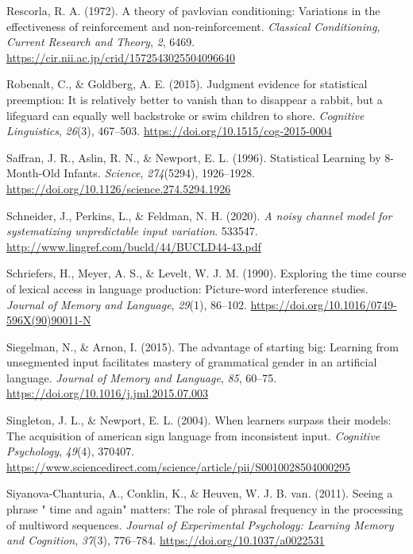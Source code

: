 \documentclass[
  12pt,
  letterpaper,
]{scrreport}
\newlength{\cslhangindent}
\newenvironment{CSLReferences}[2] %
 {\begin{list}{}{%
  \setlength{\itemindent}{0pt}
  \setlength{\leftmargin}{0pt}
  \setlength{\parsep}{0pt}
  \ifodd #1
   \setlength{\leftmargin}{\cslhangindent}
   \setlength{\itemindent}{-1\cslhangindent}
  \fi
  \setlength{\itemsep}{#2\baselineskip}}}
 {\end{list}}
\begin{document}
\begin{CSLReferences}{1}{0}
Rescorla, R. A. (1972). A theory of pavlovian conditioning: Variations
in the effectiveness of reinforcement and non-reinforcement.
\emph{Classical Conditioning, Current Research and Theory}, \emph{2},
6469. \url{https://cir.nii.ac.jp/crid/1572543025504096640}

Robenalt, C., \& Goldberg, A. E. (2015). Judgment evidence for
statistical preemption: It is relatively better to vanish than to
disappear a rabbit, but a lifeguard can equally well backstroke or swim
children to shore. \emph{Cognitive Linguistics}, \emph{26}(3), 467--503.
\url{https://doi.org/10.1515/cog-2015-0004}

Saffran, J. R., Aslin, R. N., \& Newport, E. L. (1996). Statistical
Learning by 8-Month-Old Infants. \emph{Science}, \emph{274}(5294),
1926--1928. \url{https://doi.org/10.1126/science.274.5294.1926}

Schneider, J., Perkins, L., \& Feldman, N. H. (2020). \emph{A noisy
channel model for systematizing unpredictable input variation}. 533547.
\url{http://www.lingref.com/bucld/44/BUCLD44-43.pdf}

Schriefers, H., Meyer, A. S., \& Levelt, W. J. M. (1990). Exploring the
time course of lexical access in language production: Picture-word
interference studies. \emph{Journal of Memory and Language},
\emph{29}(1), 86--102.
\url{https://doi.org/10.1016/0749-596X(90)90011-N}

Siegelman, N., \& Arnon, I. (2015). The advantage of starting big:
Learning from unsegmented input facilitates mastery of grammatical
gender in an artificial language. \emph{Journal of Memory and Language},
\emph{85}, 60--75. \url{https://doi.org/10.1016/j.jml.2015.07.003}

Singleton, J. L., \& Newport, E. L. (2004). When learners surpass their
models: The acquisition of american sign language from inconsistent
input. \emph{Cognitive Psychology}, \emph{49}(4), 370407.
\url{https://www.sciencedirect.com/science/article/pii/S0010028504000295}

Siyanova-Chanturia, A., Conklin, K., \& Heuven, W. J. B. van. (2011).
Seeing a phrase {"} time and again{"} matters: The role of phrasal
frequency in the processing of multiword sequences. \emph{Journal of
Experimental Psychology: Learning Memory and Cognition}, \emph{37}(3),
776--784. \url{https://doi.org/10.1037/a0022531}


\end{CSLReferences}
\end{document}
